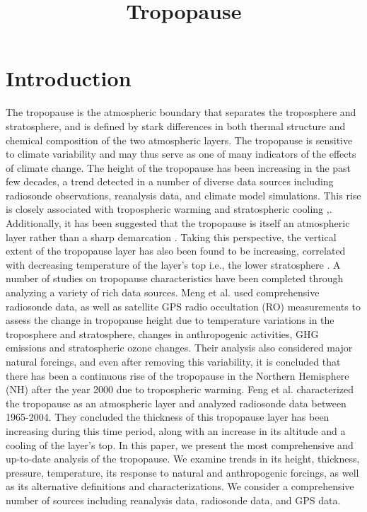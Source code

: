 \documentclass[fleqn,10pt]{wlscirep}
\title{Tropopause}
\begin{document}
\flushbottom
\maketitle
%
%
\thispagestyle{empty}


\section{Introduction}
\cite{meng2021continuous}

The tropopause is the atmospheric boundary that separates the troposphere and stratosphere, and is defined by stark differences in both thermal structure and chemical composition of the two atmospheric layers. The tropopause is sensitive to climate variability and may thus serve as one of many indicators of the effects of climate change. The height of the tropopause has been increasing in the past few decades, a trend detected in a number of diverse data sources including radiosonde observations, reanalysis data, and climate model simulations. This rise is closely associated with tropospheric warming and stratospheric cooling \cite{santer2003contributions},\cite{seidel2006variability}. Additionally, it has been suggested that the tropopause is itself an atmospheric layer rather than a sharp demarcation \cite{feng2012trends}. Taking this perspective, the vertical extent of the tropopause layer has also been found to be increasing, correlated with decreasing temperature of the layer's top i.e., the lower stratosphere \cite{feng2012trends}. A number of studies on tropopause characteristics have been completed through analyzing a variety of rich data sources. Meng et al. used comprehensive radiosonde data, as well as satellite GPS radio occultation (RO) measurements to assess the change in tropopause height due to temperature variations in the troposphere and stratosphere, changes in anthropogenic activities, GHG emissions and stratospheric ozone changes. Their analysis also considered major natural forcings, and even after removing this variability, it is concluded that there has been a continuous rise of the tropopause in the Northern Hemisphere (NH) after the year 2000 due to tropospheric warming. Feng et al. \cite{feng2012trends} characterized the tropopause as an atmospheric layer and analyzed radiosonde data between 1965-2004. They concluded the thickness of this tropopause layer has been increasing during this time period, along with an increase in its altitude and a cooling of the layer's top. In this paper, we present the most comprehensive and up-to-date analysis of the tropopause. We examine trends in its height, thickness, pressure, temperature, its response to natural and anthropogenic forcings, as well as its alternative definitions and characterizations. We consider a comprehensive number of sources including reanalysis data, radiosonde data, and GPS data. 
\end{document}

